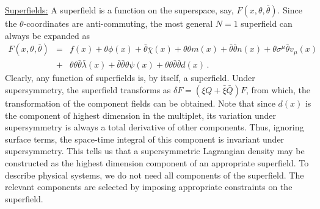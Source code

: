 \noindent\underline{Superfields:} 
\noindent A superfield is a function on the superspace, say,
$F(x,\theta,\bar\theta)$. Since the $\theta$-coordinates are
anti-commuting, the most general $N=1$ superfield can always be
expanded as  
\begin{eqnarray}
F(x,\theta,\bar\theta)&=& f(x)+\theta\phi(x) + \bar\theta\bar\chi(x)
+\theta\theta m(x) +\bar\theta\bar\theta n(x) + 
\theta\sigma^\mu\bar\theta v_\mu (x) \nonumber\\
&+&\theta\theta\bar\theta\bar\lambda(x)+\bar\theta\bar\theta\theta\psi(x)
+ \theta\theta\bar\theta\bar\theta d(x)\,. 
\label{superfield}
\end{eqnarray}
Clearly, any function of superfields is, by itself, a superfield. 
Under supersymmetry, the superfield transforms as $\delta F=(\xi
Q+\bar\xi\bar Q)F$, from which, the transformation of the component
fields can be obtained. Note that since $d(x)$ is the component of
highest dimension in the multiplet, its variation under supersymmetry
is always a total derivative of other components. Thus, ignoring
surface terms, the space-time integral of this component is invariant
under supersymmetry. This tells us that a supersymmetric Lagrangian
density may be constructed as the highest dimension component of an
appropriate superfield. To describe physical systems, we do not need
all components of the superfield. The relevant components are selected
by imposing appropriate constraints on the superfield. 

